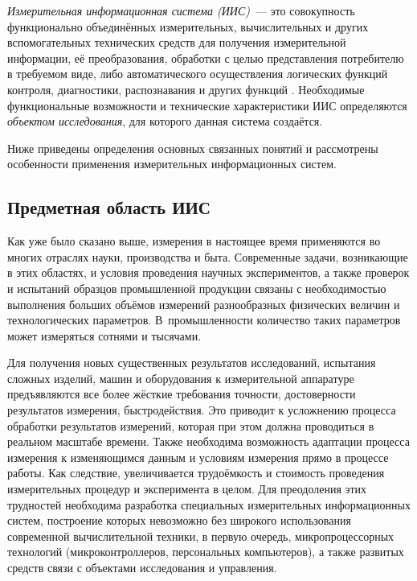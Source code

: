 \documentclass[a4paper, 14pt, titlepage]{extarticle}
\newcommand{\term}[1]{\emph{#1}}
\begin{document}
  \term{Измерительная информационная система (ИИС)}~--- это совокупность функционально объединённых
  измерительных, вычислительных и других вспомогательных технических средств для получения
  измерительной информации, её преобразования, обработки с целью представления потребителю в
  требуемом виде, либо автоматического осуществления логических функций контроля, диагностики,
  распознавания и других функций \cite[с.~9]{volkov-iis}.
  Необходимые функциональные возможности и технические характеристики ИИС определяются
  \term{объектом исследования}, для которого данная система создаётся.

  Ниже приведены определения основных связанных понятий и рассмотрены особенности применения
  измерительных информационных систем.

  \subsection{Предметная область ИИС}

  Как уже было сказано выше, измерения в настоящее время применяются
  во многих отраслях науки, производства и быта. Современные задачи, возникающие в этих областях,
  и условия проведения научных экспериментов, а также проверок и испытаний образцов промышленной
  продукции связаны с необходимостью выполнения
  больших объёмов измерений разнообразных физических величин и технологических параметров.
  В~промышленности количество таких параметров может измеряться сотнями и тысячами.

  Для получения новых существенных результатов исследований, испытания сложных изделий, машин и
  оборудования к измерительной аппаратуре предъявляются все более жёсткие требования
  точности, достоверности результатов измерения, быстродействия. Это приводит к усложнению
  процесса обработки результатов измерений, которая при этом должна проводиться в реальном масштабе
  времени. Также необходима возможность адаптации процесса измерения к изменяющимся данным и условиям
  измерения прямо в процессе работы. Как следствие, увеличивается трудоёмкость и стоимость
  проведения измерительных процедур и эксперимента в целом. Для преодоления этих трудностей
  необходима разработка специальных измерительных информационных систем, построение которых
  невозможно без широкого использования современной вычислительной техники, в первую очередь,
  микропроцессорных технологий (микроконтроллеров, персональных компьютеров), а также развитых
  средств связи с объектами исследования и управления.
\end{document}

